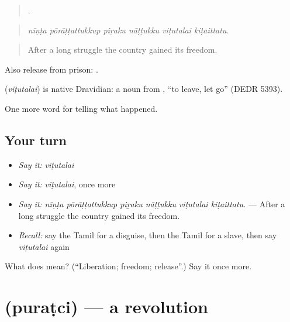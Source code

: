 \begin{quote}
     .
\end{quote}

\begin{quote}
\emph{nīṇṭa pōrāṭṭattukkup piṟaku nāṭṭukku viṭutalai kiṭaittatu.}
\end{quote}

\begin{quote}
After a long struggle the country gained its freedom.
\end{quote}

Also release from prison:  .

\begin{cousinweb}
\textbf{} (\emph{viṭutalai}) is native Dravidian: a noun from , \textquotedblleft{}to leave, let go\textquotedblright{} (DEDR 5393).
\end{cousinweb}

\begin{grammarlens}[title={What you've built}]
One more word for telling what happened.
\end{grammarlens}

\subsection*{Your turn}
\begin{itemize}
\raggedright
  \item \emph{Say it:} \emph{viṭutalai}
  \item \emph{Say it:} \emph{viṭutalai}, once more
  \item \emph{Say it:} \emph{nīṇṭa pōrāṭṭattukkup piṟaku nāṭṭukku viṭutalai kiṭaittatu.} — After a long struggle the country gained its freedom.
  \item \emph{Recall:} say the Tamil for a disguise, then the Tamil for a slave, then say \emph{viṭutalai} again
\end{itemize}

\begin{tcolorbox}[breakable,colback=teal!4,colframe=teal!35!black,title={Before you move on}]
What does  mean? (\textquotedblleft{}Liberation; freedom; release\textquotedblright{}.) Say it once more.
\end{tcolorbox}
\section[\texorpdfstring{\ta{புரட்சி} (puraṭci)}{புரட்சி (puraṭci)}]{ (puraṭci) — a revolution}

